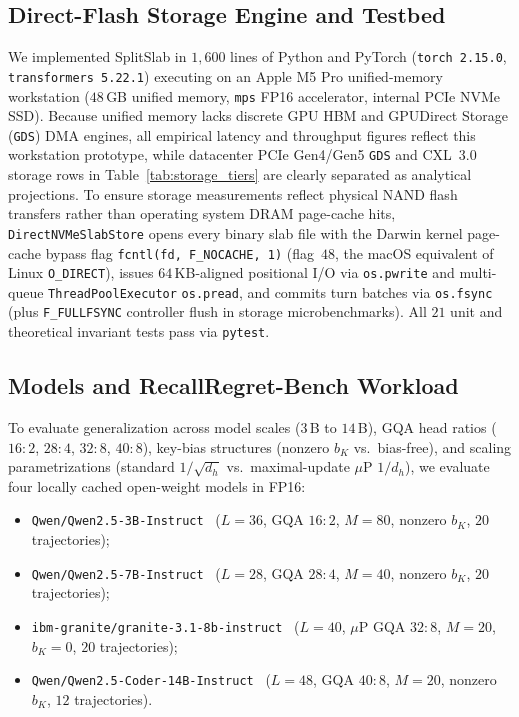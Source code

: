 \documentclass[10pt,journal,compsoc]{IEEEtran}
\theoremstyle{definition}
\theoremstyle{remark}
\newcommand{\SplitSlab}{\textup{\textsc{SplitSlab}}}
\newcommand{\RecallBench}{\textup{\textsc{RecallRegret-Bench}}}
\def\SplitSlab{SplitSlab}%
\def\RecallBench{RecallRegret-Bench}%
\begin{document}
\subsection{Direct-Flash Storage Engine and Testbed}
We implemented \SplitSlab{} in $1{,}600$ lines of Python and PyTorch (\texttt{torch 2.15.0}, \texttt{transformers 5.22.1}) executing on an Apple M5 Pro unified-memory workstation ($48$\,GB unified memory, \texttt{mps} FP16 accelerator, internal PCIe NVMe SSD). Because unified memory lacks discrete GPU HBM and GPUDirect Storage (\texttt{GDS}) DMA engines, all empirical latency and throughput figures reflect this workstation prototype, while datacenter PCIe Gen4/Gen5 \texttt{GDS} and CXL~3.0 storage rows in Table~\ref{tab:storage_tiers} are clearly separated as analytical projections. To ensure storage measurements reflect physical NAND flash transfers rather than operating system DRAM page-cache hits, \texttt{DirectNVMeSlabStore} opens every binary slab file with the Darwin kernel page-cache bypass flag \texttt{fcntl(fd, F\_NOCACHE, 1)} (flag~$48$, the macOS equivalent of Linux \texttt{O\_DIRECT}), issues $64$\,KB-aligned positional I/O via \texttt{os.pwrite} and multi-queue \texttt{ThreadPoolExecutor} \texttt{os.pread}, and commits turn batches via \texttt{os.fsync} (plus \texttt{F\_FULLFSYNC} controller flush in storage microbenchmarks). All $21$ unit and theoretical invariant tests pass via \texttt{pytest}.

\subsection{Models and \RecallBench{} Workload}
To evaluate generalization across model scales ($3$\,B to $14$\,B), GQA head ratios ($16{:}2$, $28{:}4$, $32{:}8$, $40{:}8$), key-bias structures (nonzero $b_K$ vs.\ bias-free), and scaling parametrizations (standard $1/\sqrt{d_h}$ vs.\ maximal-update $\mu\text{P}$ $1/d_h$), we evaluate four locally cached open-weight models in FP16:
\begin{itemize}
  \item \texttt{Qwen/Qwen2.5-3B-Instruct}~\cite{yang2024qwen25} ($L{=}36$, GQA $16{:}2$, $M{=}80$, nonzero $b_K$, $20$ trajectories);
  \item \texttt{Qwen/Qwen2.5-7B-Instruct}~\cite{yang2024qwen25} ($L{=}28$, GQA $28{:}4$, $M{=}40$, nonzero $b_K$, $20$ trajectories);
  \item \texttt{ibm-granite/granite-3.1-8b-instruct}~\cite{mishra2024granite} ($L{=}40$, $\mu\text{P}$ GQA $32{:}8$, $M{=}20$, $b_K{=}0$, $20$ trajectories);
  \item \texttt{Qwen/Qwen2.5-Coder-14B-Instruct}~\cite{yang2024qwen25} ($L{=}48$, GQA $40{:}8$, $M{=}20$, nonzero $b_K$, $12$ trajectories).
\end{itemize}
\end{document}
